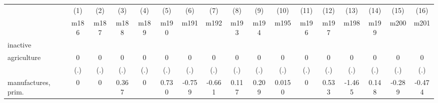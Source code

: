 {
\def\sym#1{\ifmmode^{#1}\else\(^{#1}\)\fi}
\begin{tabular}{l*{16}{c}}
\hline\hline
                    &\multicolumn{1}{c}{(1)}&\multicolumn{1}{c}{(2)}&\multicolumn{1}{c}{(3)}&\multicolumn{1}{c}{(4)}&\multicolumn{1}{c}{(5)}&\multicolumn{1}{c}{(6)}&\multicolumn{1}{c}{(7)}&\multicolumn{1}{c}{(8)}&\multicolumn{1}{c}{(9)}&\multicolumn{1}{c}{(10)}&\multicolumn{1}{c}{(11)}&\multicolumn{1}{c}{(12)}&\multicolumn{1}{c}{(13)}&\multicolumn{1}{c}{(14)}&\multicolumn{1}{c}{(15)}&\multicolumn{1}{c}{(16)}\\
                    &\multicolumn{1}{c}{m186}&\multicolumn{1}{c}{m187}&\multicolumn{1}{c}{m188}&\multicolumn{1}{c}{m189}&\multicolumn{1}{c}{m190}&\multicolumn{1}{c}{m191}&\multicolumn{1}{c}{m192}&\multicolumn{1}{c}{m193}&\multicolumn{1}{c}{m194}&\multicolumn{1}{c}{m195}&\multicolumn{1}{c}{m196}&\multicolumn{1}{c}{m197}&\multicolumn{1}{c}{m198}&\multicolumn{1}{c}{m199}&\multicolumn{1}{c}{m200}&\multicolumn{1}{c}{m201}\\
\hline
inactive            &                     &                     &                     &                     &                     &                     &                     &                     &                     &                     &                     &                     &                     &                     &                     &                     \\
agriculture         &           0         &           0         &           0         &           0         &           0         &           0         &           0         &           0         &           0         &           0         &           0         &           0         &           0         &           0         &           0         &           0         \\
                    &         (.)         &         (.)         &         (.)         &         (.)         &         (.)         &         (.)         &         (.)         &         (.)         &         (.)         &         (.)         &         (.)         &         (.)         &         (.)         &         (.)         &         (.)         &         (.)         \\
[1em]
manufactures, prim. &           0         &           0         &       0.367         &           0         &       0.730         &      -0.759         &      -0.661         &       0.117         &       0.209         &      0.0150         &           0         &       0.533         &      -1.465         &       0.148         &      -0.289         &      -0.474         \\

\end{tabular}}
